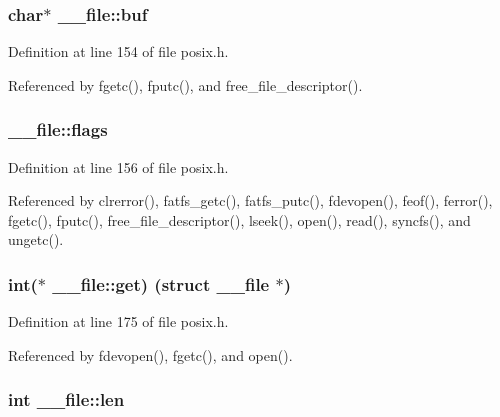 \subsubsection[{\texorpdfstring{buf}{buf}}]{\setlength{\rightskip}{0pt plus 5cm}char$\ast$ \+\_\+\+\_\+file\+::buf}\hypertarget{struct____file_a3e5a85ae919a90efbb7cb44ccb54fe46}{}\label{struct____file_a3e5a85ae919a90efbb7cb44ccb54fe46}


Definition at line 154 of file posix.\+h.



Referenced by fgetc(), fputc(), and free\+\_\+file\+\_\+descriptor().

\subsubsection[{\texorpdfstring{flags}{flags}}]{ \+\_\+\+\_\+file\+::flags}\hypertarget{struct____file_a8d11df8679502efee09740f97d7c277b}{}\label{struct____file_a8d11df8679502efee09740f97d7c277b}


Definition at line 156 of file posix.\+h.



Referenced by clrerror(), fatfs\+\_\+getc(), fatfs\+\_\+putc(), fdevopen(), feof(), ferror(), fgetc(), fputc(), free\+\_\+file\+\_\+descriptor(), lseek(), open(), read(), syncfs(), and ungetc().

\subsubsection[{\texorpdfstring{get}{get}}]{\setlength{\rightskip}{0pt plus 5cm}int($\ast$ \+\_\+\+\_\+file\+::get) (struct {\bf \+\_\+\+\_\+file} $\ast$)}\hypertarget{struct____file_a2d816b077c3af0425344fe4b283dad33}{}\label{struct____file_a2d816b077c3af0425344fe4b283dad33}


Definition at line 175 of file posix.\+h.



Referenced by fdevopen(), fgetc(), and open().

\subsubsection[{\texorpdfstring{len}{len}}]{\setlength{\rightskip}{0pt plus 5cm}int \+\_\+\+\_\+file\+::len}\hypertarget{struct____file_a30309efd13a75ed510bb2370debafaf8}{}\label{struct____file_a30309efd13a75ed510bb2370debafaf8}


